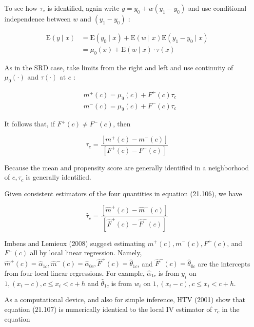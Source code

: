 \documentclass[10pt]{article}
\begin{document}
To see how $\tau_{c}$ is identified, again write $y=y_{0}+w\left(y_{1}-y_{0}\right)$ and use conditional independence between $w$ and $\left(y_{1}-y_{0}\right)$ :

$$
\begin{aligned}
\mathrm{E}(y \mid x) & =\mathrm{E}\left(y_{0} \mid x\right)+\mathrm{E}(w \mid x) \mathrm{E}\left(y_{1}-y_{0} \mid x\right) \\
& =\mu_{0}(x)+\mathrm{E}(w \mid x) \cdot \tau(x)
\end{aligned}
$$

As in the SRD case, take limits from the right and left and use continuity of $\mu_{0}(\cdot)$ and $\tau(\cdot)$ at $c$ :

$$
\begin{aligned}
& m^{+}(c)=\mu_{0}(c)+F^{+}(c) \tau_{c} \\
& m^{-}(c)=\mu_{0}(c)+F^{-}(c) \tau_{c}
\end{aligned}
$$

It follows that, if $F^{+}(c) \neq F^{-}(c)$, then


\begin{equation*}
\tau_{c}=\frac{\left[m^{+}(c)-m^{-}(c)\right]}{\left[F^{+}(c)-F^{-}(c)\right]} \tag{21.106}
\end{equation*}


Because the mean and propensity score are generally identified in a neighborhood of $c, \tau_{c}$ is generally identified.

Given consistent estimators of the four quantities in equation (21.106), we have


\begin{equation*}
\hat{\tau}_{c}=\frac{\left[\hat{m}^{+}(c)-\hat{m}^{-}(c)\right]}{\left[\hat{F}^{+}(c)-\hat{F}^{-}(c)\right]} \tag{21.107}
\end{equation*}


Imbens and Lemieux (2008) suggest estimating $m^{+}(c), m^{-}(c), F^{+}(c)$, and $F^{-}(c)$ all by local linear regression. Namely, $\hat{m}^{+}(c)=\hat{\alpha}_{1 c}, \hat{m}^{-}(c)=\hat{\alpha}_{0 c}, \hat{F}^{+}(c)=\hat{\theta}_{1 c}$, and $\hat{F}^{-}(c)=\hat{\theta}_{0 c}$ are the intercepts from four local linear regressions. For example, $\hat{\alpha}_{1 c}$ is from $y_{i}$ on $1,\left(x_{i}-c\right), c \leq x_{i}<c+h$ and $\hat{\theta}_{1 c}$ is from $w_{i}$ on $1,\left(x_{i}-c\right), c \leq x_{i}<c+h$.

As a computational device, and also for simple inference, HTV (2001) show that equation (21.107) is numerically identical to the local IV estimator of $\tau_{c}$ in the equation
\end{document}
